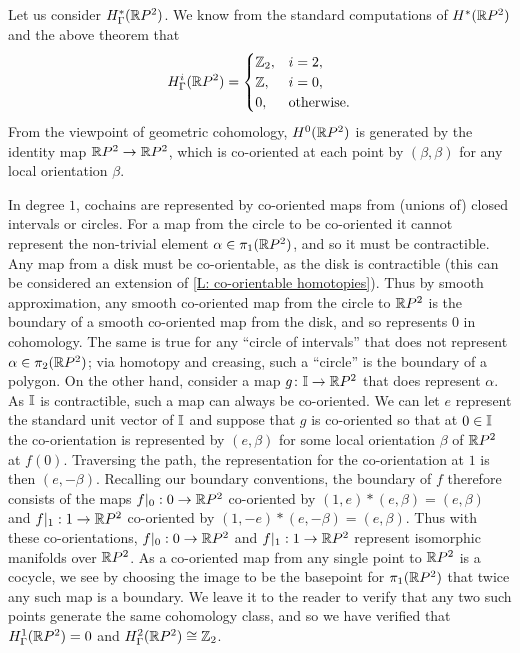 \begin{example}
	Let us consider $H^*_\Gamma(\mathbb{R} P^2)$.
	We know from the standard computations of $H^*(\mathbb{R} P^2)$ and the above theorem that
	\begin{equation*}
		H_\Gamma^i(\mathbb{R} P^2) =
		\begin{cases}
			\mathbb{Z}_2,&i = 2,\\
			\mathbb{Z},&i = 0,\\
			0,&\text{otherwise.}
		\end{cases}
	\end{equation*}
	From the viewpoint of geometric cohomology, $H^0(\mathbb{R} P^2)$ is generated by the identity map $\mathbb{R} P^2 \to \mathbb{R} P^2$, which is co-oriented at each point by $(\beta,\beta)$ for any local orientation $\beta$.

	In degree $1$, cochains are represented by co-oriented maps from (unions of) closed intervals or circles.
	For a map from the circle to be co-oriented it cannot represent the non-trivial element $\alpha \in \pi_1(\mathbb{R} P^2)$, and so it must be contractible.
	Any map from a disk must be co-orientable, as the disk is contractible (this can be considered an extension of \cref{L: co-orientable homotopies}).
	Thus by smooth approximation, any smooth co-oriented map from the circle to $\mathbb{R} P^2$ is the boundary of a smooth co-oriented map from the disk, and so represents $0$ in cohomology.
	The same is true for any ``circle of intervals'' that does not represent $\alpha \in \pi_2(\mathbb{R} P^2)$; via homotopy and creasing, such a ``circle'' is the boundary of a polygon.
	On the other hand, consider a map $g \colon \mathbb{I} \to \mathbb{R} P^2$ that does represent $\alpha$.
	As $\mathbb{I}$ is contractible, such a map can always be co-oriented.
	We can let $e$ represent the standard unit vector of $\mathbb{I}$ and suppose that $g$ is co-oriented so that at $0 \in \mathbb{I}$ the co-orientation is represented by $(e,\beta)$ for some local orientation $\beta$ of $\mathbb{R} P^2$ at $f(0)$.
	Traversing the path, the representation for the co-orientation at $1$ is then $(e,-\beta)$.
	Recalling our boundary conventions, the boundary of $f$ therefore consists of the maps $f|_0:0 \to \mathbb{R} P^2$ co-oriented by $(1,e)*(e,\beta) = (e,\beta)$ and $f|_1:1 \to \mathbb{R} P^2$ co-oriented by $(1,-e)*(e,-\beta) = (e,\beta)$.
	Thus with these co-orientations, $f|_0:0 \to \mathbb{R} P^2$ and $f|_1:1 \to \mathbb{R} P^2$ represent isomorphic manifolds over $\mathbb{R} P^2$.
	As a co-oriented map from any single point to $\mathbb{R} P^2$ is a cocycle, we see by choosing the image to be the basepoint for $\pi_1(\mathbb{R} P^2)$ that twice any such map is a boundary.
	We leave it to the reader to verify that any two such points generate the same cohomology class, and so we have verified that $H^1_\Gamma(\mathbb{R} P^2) = 0$ and $H_\Gamma^2(\mathbb{R} P^2) \cong \mathbb{Z}_2$.
\end{example}


